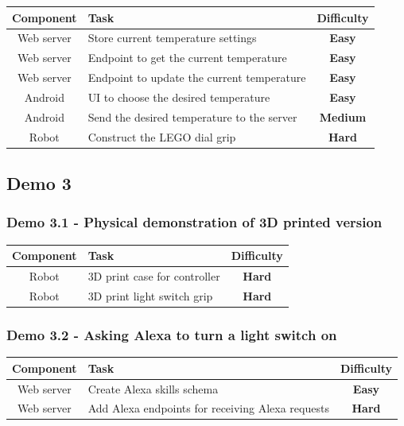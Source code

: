 \documentclass[onecolumn]{IEEEtran}
\newcommand{\easy}{{\color{green} \textbf{Easy}}}
\newcommand{\medium}{{\color{orange} \textbf{Medium}}}
\newcommand{\hard}{{\color{red} \textbf{Hard}}}
\begin{document}
\begin{center}
    \begin{tabularx}{0.8\linewidth}{|c|L|c|}
        \hline
        \textbf{Component} & \textbf{Task} & \textbf{Difficulty} \\
        \hline
        Web server & Store current temperature settings & \easy \\
        \hline
        Web server & Endpoint to get the current temperature & \easy \\
        \hline
        Web server & Endpoint to update the current temperature & \easy \\
        \hline
        Android & UI to choose the desired temperature & \easy \\
        \hline
        Android & Send the desired temperature to the server & \medium \\
        \hline
        Robot & Construct the LEGO dial grip & \hard \\
        \hline
    \end{tabularx}
\end{center}

\subsection{Demo 3}

\subsubsection{Demo 3.1 - Physical demonstration of 3D printed version}

\begin{center}
    \begin{tabularx}{0.8\linewidth}{|c|L|c|}
        \hline
        \textbf{Component} & \textbf{Task} & \textbf{Difficulty} \\
        \hline
        Robot & 3D print case for controller & \hard \\
        \hline
        Robot & 3D print light switch grip & \hard \\
        \hline
    \end{tabularx}
\end{center}

\subsubsection{Demo 3.2 - Asking Alexa to turn a light switch on}

\begin{center}
    \begin{tabularx}{0.8\linewidth}{|c|L|c|}
        \hline
        \textbf{Component} & \textbf{Task} & \textbf{Difficulty} \\
        \hline
        Web server & Create Alexa skills schema & \easy \\
        \hline
        Web server & Add Alexa endpoints for receiving Alexa requests & \hard \\
        \hline
    \end{tabularx}
\end{center}
\end{document}
